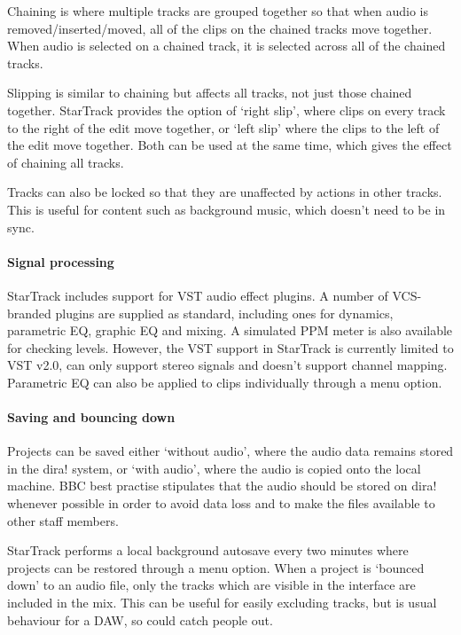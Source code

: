Chaining is where multiple tracks are grouped together so that when audio is
removed\slash inserted\slash moved, all of the clips on the chained tracks move
together.  When audio is selected on a chained track, it is selected across all
of the chained tracks.

Slipping is similar to chaining but affects all tracks, not just those chained
together. StarTrack provides the option of `right slip', where clips on every
track to the right of the edit move together, or `left slip' where the clips to
the left of the edit move together. Both can be used at the same time, which
gives the effect of chaining all tracks.

Tracks can also be locked so that they are unaffected by actions in other
tracks. This is useful for content such as background music, which doesn't need
to be in sync.

\paragraph{Signal processing}
StarTrack includes support for VST audio effect plugins. A number of
VCS-branded plugins are supplied as standard, including ones for dynamics,
parametric EQ, graphic EQ and mixing. A simulated PPM meter is also available
for checking levels. However, the VST support in StarTrack is currently limited
to VST v2.0, can only support stereo signals and doesn't support channel
mapping. Parametric EQ can also be applied to clips individually through a menu
option.

\paragraph{Saving and bouncing down}
Projects can be saved either `without audio', where the audio data remains
stored in the dira! system, or `with audio', where the audio is copied onto the
local machine. BBC best practise stipulates that the audio should be stored on
dira! whenever possible in order to avoid data loss and to make the files
available to other staff members.

StarTrack performs a local background autosave every two minutes where projects
can be restored through a menu option. When a project is `bounced down' to an
audio file, only the tracks which are visible in the interface are included in
the mix. This can be useful for easily excluding tracks, but is usual behaviour
for a DAW, so could catch people out.
